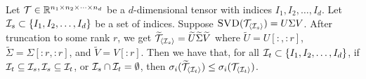 \begin{lemma}\label{lemma:appendix:trunc}
Let $\mathcal{T} \in \mathbb{R}^{n_1 \times n_2 \times \cdots \times n_d}$ be a $d$-dimensional tensor with indices $I_1, I_2, \ldots, I_d$.
%
Let $\mathcal{I}_s \subset \{I_1, I_2, \ldots, I_d\}$ be a set of indices.
Suppose $\textsc{SVD}(\mathcal{T}_{\langle\mathcal{I}_s\rangle}) = U \Sigma V$. After truncation to some rank $r$, we get $\widetilde{\mathcal{T}}_{\langle \mathcal{I}_s \rangle} = \widetilde{U}\widetilde{\Sigma}\widetilde{V}$ where $\widetilde{U} = U[:,:r]$, $\widetilde{\Sigma} = \Sigma[:r, :r]$, and $\widetilde{V} = V[:r]$.
%
Then we have that, for all $\mathcal{I}_t \subset \{I_1, I_2, \ldots, I_d\}$, if $\mathcal{I}_t \subseteq \mathcal{I}_s, \mathcal{I}_s \subseteq \mathcal{I}_t$, or $\mathcal{I}_s \cap \mathcal{I}_t = \emptyset$, then  $\sigma_i(\widetilde{\mathcal{T}}_{\langle \mathcal{I}_t \rangle}) \leq \sigma_i(\mathcal{T}_{\langle\mathcal{I}_t\rangle})$.
\end{lemma}

